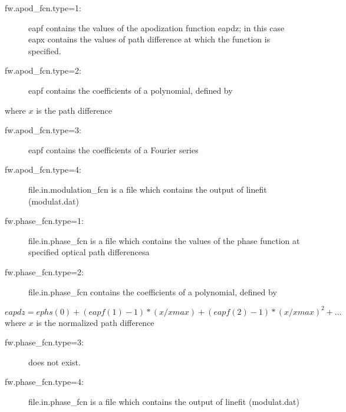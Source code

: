 \documentclass[a4paper]{article}
\begin{document}
\begin{description}
\item [fw.apod\_fcn.type=1:] eapf contains the values of the apodization function eapdz; 
  in this case eapx contains the values of path difference at 
  which the function is specified.
\item[fw.apod\_fcn.type=2:] eapf contains the coefficients of a polynomial, defined
  by
\end{description}
where $x$ is the path difference
\begin{description}
\item [fw.apod\_fcn.type=3:] eapf contains the coefficients of a Fourier series
\end{description}
\begin{description}
\item [fw.apod\_fcn.type=4:] file.in.modulation\_fcn is a file which contains the output of linefit (modulat.dat)
\end{description}


\begin{description}
\item [fw.phase\_fcn.type=1:] file.in.phase\_fcn is a file which contains the values of the phase function at specified optical path differencesa 
\item[fw.phase\_fcn.type=2:]  file.in.phase\_fcn contains the coefficients of a polynomial, defined
  by
\end{description}
\begin{equation}
  eapdz = ephs(0) + (eapf(1)-1)*(x/xmax) + (eapf(2)-1)*(x/xmax)^2 + \ldots
\end{equation}
where $x$ is the normalized path difference
\begin{description}
\item [fw.phase\_fcn.type=3:] does not exist.
\item [fw.phase\_fcn.type=4:] file.in.phase\_fcn is a file which contains the output of linefit (modulat.dat)
\end{description}
\end{document}
